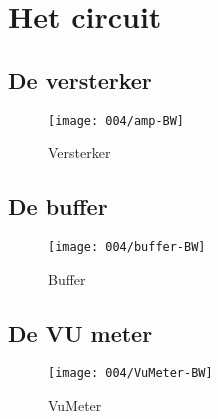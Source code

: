 \section{Het circuit}

\subsection{De versterker}
\begin{figure}[ht]
    \centering
    \texttt{[image: 004/amp-BW]}
    \caption{Versterker}
    \label{fig:Versterker}
\end{figure}

\subsection{De buffer}
\begin{figure}[ht]
    \centering
    \texttt{[image: 004/buffer-BW]}
    \caption{Buffer}
    \label{fig:Buffer}
\end{figure}

\subsection{De VU meter}
\begin{figure}[ht]
    \centering
    \texttt{[image: 004/VuMeter-BW]}
    \caption{VuMeter}
    \label{fig:VuMeter}
\end{figure}